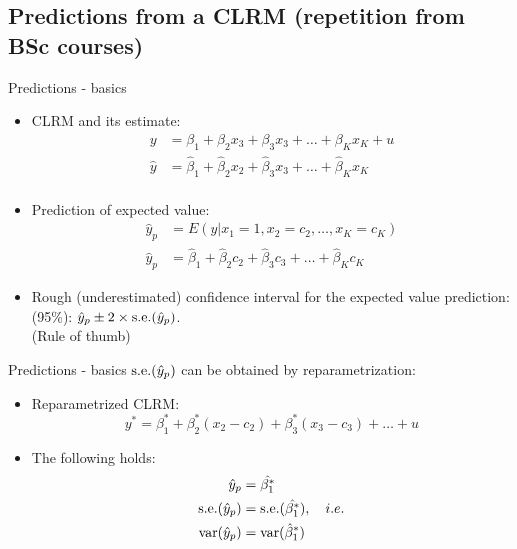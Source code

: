 \documentclass{beamer}
\begin{document}
\subsection{Predictions from a CLRM (repetition from BSc courses)}
\begin{frame}{Predictions - basics}
\begin{itemize}
\item CLRM and its estimate:
\begin{align}\nonumber
y & = \beta_1 + \beta_2 x_3 +\beta_3 x_3 + \dots + \beta_K x_K + u\\ \nonumber
\hat{y} & = \hat{\beta}_1 + \hat{\beta}_2 x_2 +\hat{\beta}_3 x_3 + \dots + \hat{\beta}_K x_K \\ \nonumber
\end{align}
\item Prediction of expected value: 
\begin{align}\nonumber
\hat{y}_p & = E(y|x_1 = 1, x_2 = c_2,\dots,x_K = c_K)\\ \nonumber
\hat{y}_p & = \hat{\beta}_1 + \hat{\beta}_2 c_2 +\hat{\beta}_3 c_3 + \dots + \hat{\beta}_K c_K  \nonumber
\end{align}
\item Rough (underestimated) confidence interval for the expected value prediction: (95\%): $\hat{y}_p \pm 2 \times \textnormal{s.e.}(\hat{y}_p)$. \\ (Rule of thumb) 
\end{itemize}
\end{frame}


\begin{frame}{Predictions - basics}
$\textnormal{s.e.}(\hat{y}_p)$ can be obtained by reparametrization:

\vspace{0.5cm}
\begin{itemize}
\item Reparametrized CLRM:
$$y^*=\beta^*_1 + \beta^*_2 (x_2 -c_2) + \beta^*_3(x_3 - c_3) + \dots + u$$
\item The following holds:
\begin{align} \nonumber
 \hat{y}_p &= \hat{\beta_1^*} \\ \nonumber
 \textnormal{s.e.}(\hat{y}_p ) &= 
   \textnormal{s.e.}(\hat{\beta_1^*}), \quad i.e. \\ \nonumber
 \textnormal{var}(\hat{y}_p) &= \textnormal{var}(\hat{\beta}_1^*)
\end{align} 
\end{itemize}
\end{frame}
\end{document}
